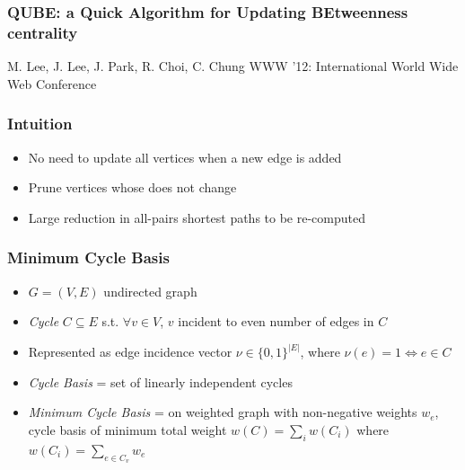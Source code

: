 \begin{frame}
  \frametitle{QUBE: a Quick Algorithm for Updating BEtweenness centrality}
  \centering
  \vfill
  {\huge M. Lee, J. Lee, J. Park, R. Choi, C. Chung}
  \vfill
  {\large WWW '12: International World Wide Web Conference}
\end{frame}


\begin{frame}
  \frametitle{Intuition}
  
  \begin{itemize}
    \item No need to update all vertices when a new edge is added
    \item Prune vertices whose \betw does not change
    \item Large reduction in all-pairs shortest paths to be re-computed
  \end{itemize}
\end{frame}


\begin{frame}
  \frametitle{Minimum Cycle Basis}
  
  \begin{itemize}
    \item $G=(V,E)$ undirected graph
    \item \emph{Cycle} $C \subseteq E$ s.t. $\forall v \in V$, $v$ incident to even number of edges in $C$
    \item Represented as edge incidence vector $\nu \in \{ 0,1 \}^{|E|}$, where $\nu(e) = 1 \iff e \in C$ 
    \item \emph{Cycle Basis} = set of linearly independent cycles
    \item \emph{Minimum Cycle Basis} = on weighted graph with non-negative weights $w_e$, cycle basis of minimum total weight $w(C) = \sum_{i} w(C_i)$ where $w(C_i) = \sum_{e \in C_v} w_e$
  \end{itemize}  
\end{frame}


